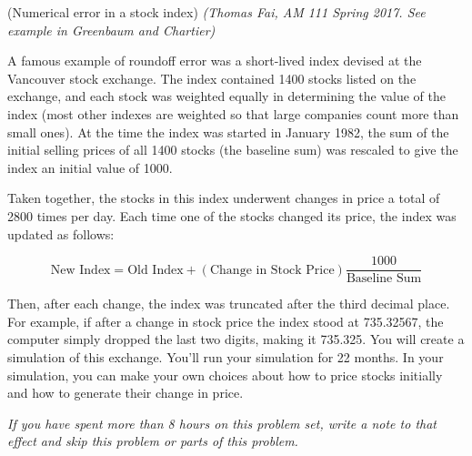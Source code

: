 \documentclass[12pt,letterpaper,noanswers]{exam}
\begin{document}
\begin{questions}
\question (Numerical error in a stock index) \emph{(Thomas Fai, AM 111 Spring 2017.  See example in Greenbaum and Chartier) }

A famous example of roundoff error was a short-lived index devised at the Vancouver stock exchange\cite{quinn1983}. The index contained 1400 stocks listed on the exchange, and each stock was weighted equally in determining the value of the index (most other indexes are weighted so that large companies count more than small ones). At the time the index was started in January 1982, the sum of the initial selling prices of all 1400 stocks (the baseline sum) was rescaled to give the index an initial value of 1000.

Taken together, the stocks in this index underwent changes in price a total of 2800 times per day. Each time one of the stocks changed its price, the index was updated as follows:

\[\text{New Index} = \text{Old Index} + (\text{Change in Stock Price})\dfrac{1000}{\text{Baseline Sum}}\]

Then, after each change, the index was truncated after the third decimal place. For example, if after a change in stock price the index stood at 735.32567, the computer simply dropped the last two digits, making it 735.325.
You will create a simulation of this exchange.  You'll run your simulation for 22 months.  In your simulation, you can make your own choices about how to price stocks initially and how to generate their change in price.

\emph{If you have spent more than 8 hours on this problem set, write a note to that effect and skip this problem or parts of this problem.}

\end{questions}
\end{document}
